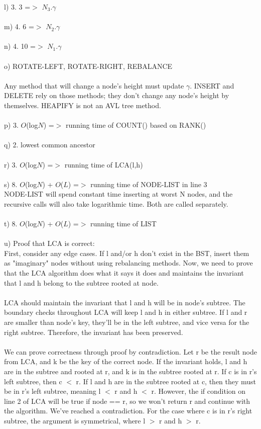 \documentclass{article}
\begin{document}
l) 3. 3 =$>$ $N_3.\gamma$ \\\\
m) 4. 6 =$>$ $N_2.\gamma$ \\\\
n) 4. 10 =$>$ $N_1.\gamma$ \\\\
o) ROTATE-LEFT, ROTATE-RIGHT, REBALANCE \\\\
Any method that will change a node's height must update $\gamma$. INSERT and DELETE rely on those methods; they don't change any node's height by themselves. HEAPIFY is not an AVL tree method. \\\\
p) 3. $O$(log$N$) =$>$ running time of COUNT() based on RANK() \\\\
q) 2. lowest common ancestor \\\\
r) 3. $O$(log$N$) =$>$ running time of LCA(l,h) \\\\
s) 8. $O$(log$N$) + $O$($L$) =$>$ running time of NODE-LIST in line 3 \\
NODE-LIST will spend constant time inserting at worst N nodes, and the recursive calls will also take logarithmic time. Both are called separately.\\\\
t) 8. $O$(log$N$) + $O$($L$) =$>$ running time of LIST \\\\
u) Proof that LCA is correct: \\
First, consider any edge cases. If l and/or h don't exist in the BST, insert them as "imaginary" nodes without using rebalancing methods. Now, we need to prove that the LCA algorithm does what it says it does and maintains the invariant that l and h belong to the subtree rooted at node.\\\\
LCA should maintain the invariant that l and h will be in node's subtree. The boundary checks throughout LCA will keep l and h in either subtree. If l and r are smaller than node's key, they'll be in the left subtree, and vice versa for the right subtree. Therefore, the invariant has been preserved. \\\\
We can prove correctness through proof by contradiction. Let r be the result node from LCA, and k be the key of the correct node. If the invariant holds, l and h are in the subtree and rooted at r, and k is in the subtree rooted at r. If c is in r's left subtree, then c $<$ r. If l and h are in the subtree rooted at c, then they must be in r's left subtree, meaning l $<$ r and h $<$ r. However, the if condition on line 2 of LCA will be true if node == r, so we won't return r and continue with the algorithm. We've reached a contradiction. For the case where c is in r's right subtree, the argument is symmetrical, where l $>$ r and h $>$ r.\\\\
\end{document}

